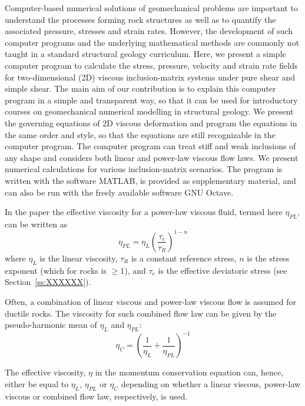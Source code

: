 \begin{center}
\begin{minipage}{13cm}
{\small 
Computer-based numerical solutions of geomechanical problems are important to understand the processes
forming rock structures as well as to quantify the associated pressure, stresses and strain rates. However, the
development of such computer programs and the underlying mathematical methods are commonly not taught in
a standard structural geology curriculum. Here, we present a simple computer program to calculate the stress,
pressure, velocity and strain rate fields for two-dimensional (2D) viscous inclusion-matrix systems under pure
shear and simple shear. The main aim of our contribution is to explain this computer program in a simple and
transparent way, so that it can be used for introductory courses on geomechanical numerical modelling in
structural geology. We present the governing equations of 2D viscous deformation and program the equations in
the same order and style, so that the equations are still recognizable in the computer program. The computer
program can treat stiff and weak inclusions of any shape and considers both linear and power-law viscous flow
laws. We present numerical calculations for various inclusion-matrix scenarios. The program is written with the
software MATLAB, is provided as supplementary material, and can also be run with the freely available software
GNU Octave.}
\end{minipage}
\end{center}
 

In the paper the effective viscosity for a power-law viscous fluid, termed here $\eta_{PL}$, can be written
as
\[
\eta_{PL}=\eta_L \left( \frac{\tau_e}{\tau_R}  \right)^{1-n}
\]
where $\eta_L$ is the linear viscosity, $\tau_R$ is a constant reference stress, 
$n$ is the stress exponent (which for rocks is $\ge$1), and $\tau_e$ is the effective 
deviatoric stress (see Section~\ref{ss:XXXXXX}).

Often, a combination of linear viscous and power-law viscous flow is
assumed for ductile rocks. The viscosity for such combined flow law can
be given by the pseudo-harmonic mean of $\eta_L$ and $\eta_{PL}$:
\[
\eta_C = \left(  \frac{1}{\eta_L} + \frac{1}{\eta_{PL}} \right)^{-1}
\]

The effective viscosity, $\eta$ in the momentum conservation equation can, hence, either be
equal to $\eta_L$, $\eta_{PL}$ or $\eta_C$ depending on whether a linear viscous, power-law
viscous or combined flow law, respectively, is used.

